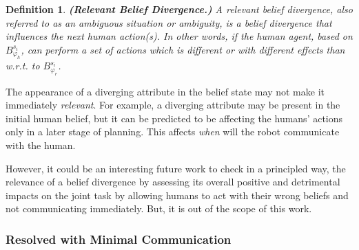 \documentclass[letterpaper]{article} %
\newtheorem{definition}{Definition}
\begin{document}
\begin{definition} \label{def:reldiv}
\textbf{(Relevant Belief Divergence.)} A relevant belief divergence, also referred to as an ambiguous situation or ambiguity, is a belief divergence that influences the next human action(s). In other words, if the human agent, based on $\mathit{B}_{\varphi_h}^{s_i}$, can perform a set of actions which is different or with different effects than w.r.t. to $\mathit{B}_{\varphi_r}^{s_i}$.
\end{definition}

The appearance of a diverging attribute in the belief state may not make it immediately \textit{relevant}. 
For example, a diverging attribute may be present in the initial human belief, but it can be predicted to be affecting the humans' actions only in a later stage of planning.
This affects \textit{when} will the robot communicate with the human.

However, it could be an interesting future work to check in a principled way, the relevance of a belief divergence 
by assessing its overall positive and detrimental impacts on the joint task by allowing humans to act with their wrong beliefs and not communicating immediately.
But, it is out of the scope of this work. 

\subsubsection{Resolved with Minimal Communication}


\end{document}
